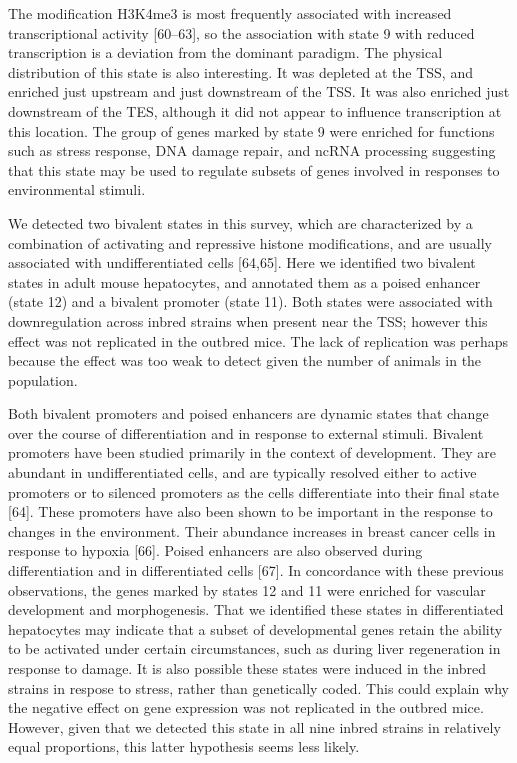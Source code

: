 \documentclass[10pt,letterpaper]{article}
\begin{document}
The modification H3K4me3 is most frequently associated with increased
transcriptional activity {[}60--63{]}, so the association with state 9
with reduced transcription is a deviation from the dominant paradigm.
The physical distribution of this state is also interesting. It was
depleted at the TSS, and enriched just upstream and just downstream of
the TSS. It was also enriched just downstream of the TES, although it
did not appear to influence transcription at this location. The group of
genes marked by state 9 were enriched for functions such as stress
response, DNA damage repair, and ncRNA processing suggesting that this
state may be used to regulate subsets of genes involved in responses to
environmental stimuli.

We detected two bivalent states in this survey, which are characterized
by a combination of activating and repressive histone modifications, and
are usually associated with undifferentiated cells {[}64,65{]}. Here we
identified two bivalent states in adult mouse hepatocytes, and annotated
them as a poised enhancer (state 12) and a bivalent promoter (state 11).
Both states were associated with downregulation across inbred strains
when present near the TSS; however this effect was not replicated in the
outbred mice. The lack of replication was perhaps because the effect was
too weak to detect given the number of animals in the population.

Both bivalent promoters and poised enhancers are dynamic states that
change over the course of differentiation and in response to external
stimuli. Bivalent promoters have been studied primarily in the context
of development. They are abundant in undifferentiated cells, and are
typically resolved either to active promoters or to silenced promoters
as the cells differentiate into their final state {[}64{]}. These
promoters have also been shown to be important in the response to
changes in the environment. Their abundance increases in breast cancer
cells in response to hypoxia {[}66{]}. Poised enhancers are also
observed during differentiation and in differentiated cells {[}67{]}. In
concordance with these previous observations, the genes marked by states
12 and 11 were enriched for vascular development and morphogenesis. That
we identified these states in differentiated hepatocytes may indicate
that a subset of developmental genes retain the ability to be activated
under certain circumstances, such as during liver regeneration in
response to damage. It is also possible these states were induced in the
inbred strains in respose to stress, rather than genetically coded. This
could explain why the negative effect on gene expression was not
replicated in the outbred mice. However, given that we detected this
state in all nine inbred strains in relatively equal proportions, this
latter hypothesis seems less likely.
\end{document}
